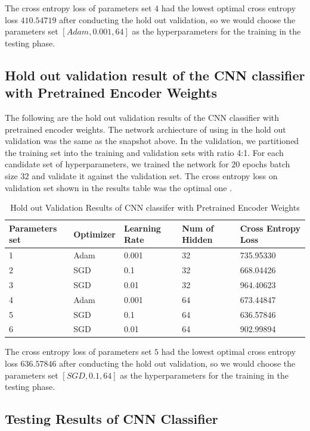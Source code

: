 \documentclass{article}
\begin{document}
The cross entropy loss of parameters set $4$ had the lowest optimal cross entropy loss $410.54719$ after conducting the hold out validation, so we would choose the parameters set $[Adam, 0.001, 64]$ as the hyperparameters for the training in the testing phase.


\subsection{Hold out validation result of the CNN classifier with Pretrained Encoder Weights}

The following are the hold out validation results of the CNN classifier with pretrained encoder weights. The network archiecture of using in the hold out validation was the same as the snapshot above. In the validation, we partitioned the training set into the training and validation sets with ratio 4:1. For each candidate set of hyperparameters, we trained the network for $20$ epochs batch size $32$ and validate it against the validation set.  The cross entropy loss on validation set shown in the results table was the optimal one .


\begin{table}[htb]
\caption{Hold out Validation Results of CNN classifer with Pretrained Encoder Weights}
	\label{sample-table}
	\centering
\begin{tabular}{lllll}
\toprule
		\cmidrule{1-5}
		Parameters set& Optimizer & Learning Rate & Num of Hidden & Cross Entropy Loss 		\\
		\midrule
 			1 & Adam & 0.001 & 32 & 735.95330 \\
 			2 & SGD & 0.1 & 32 &  668.04426\\
 			3 & SGD & 0.01 & 32 & 964.40623 \\
 			4 & Adam & 0.001 & 64 & 673.44847 \\
 			5 & SGD & 0.1 & 64 &  636.57846\\
 			6 & SGD & 0.01 & 64 & 902.99894 \\
\bottomrule
\end{tabular}
\end{table}

The cross entropy loss of parameters set $5$ had the lowest optimal cross entropy loss $636.57846$ after conducting the hold out validation, so we would choose the parameters set $[SGD, 0.1, 64]$ as the hyperparameters for the training in the testing phase.


\subsection{Testing Results of CNN Classifier}
\end{document}
